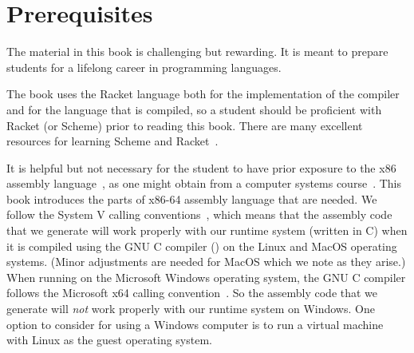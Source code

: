 \documentclass[11pt]{book}
\begin{document}
\section*{Prerequisites}

The material in this book is challenging but rewarding. It is meant to
prepare students for a lifelong career in programming languages.

The book uses the Racket language both for the implementation of the
compiler and for the language that is compiled, so a student should be
proficient with Racket (or Scheme) prior to reading this book. There
are many excellent resources for learning Scheme and
Racket~\citep{Dybvig:1987aa,Abelson:1996uq,Friedman:1996aa,Felleisen:2001aa,Felleisen:2013aa,Flatt:2014aa}.

It is helpful but not necessary for the student to have prior exposure
to the x86 assembly language~\citep{Intel:2015aa}, as one might obtain
from a computer systems
course~\citep{Bryant:2010aa}. This book introduces the
parts of x86-64 assembly language that are needed.
%
We follow the System V calling
conventions~\citep{Bryant:2005aa,Matz:2013aa}, which means that the
assembly code that we generate will work properly with our runtime
system (written in C) when it is compiled using the GNU C compiler
() on the Linux and MacOS operating systems. (Minor
adjustments are needed for MacOS which we note as they arise.)
%
When running on the Microsoft Windows operating system, the GNU C
compiler follows the Microsoft x64 calling
convention~\citep{Microsoft:2018aa,Microsoft:2020aa}. So the assembly
code that we generate will \emph{not} work properly with our runtime
system on Windows. One option to consider for using a Windows computer
is to run a virtual machine with Linux as the guest operating system.


\end{document}
